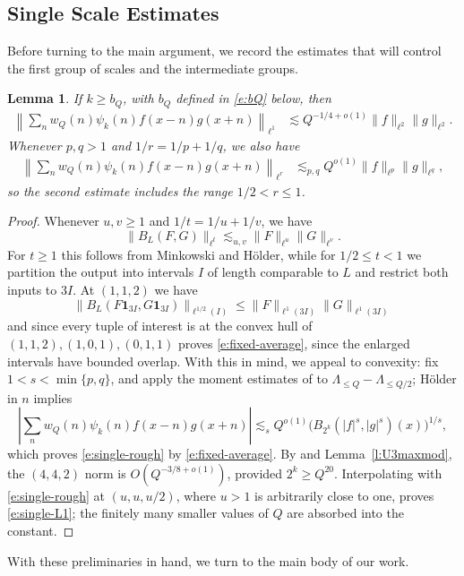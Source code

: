 \documentclass[12pt,leqno]{amsart}
\numberwithin{equation}{section}
\newtheorem{lemma}[equation]{Lemma}
\theoremstyle{definition}
\theoremstyle{plain}
\begin{document}
	\subsection{Single Scale Estimates}
	Before turning to the main argument, we record the estimates that will
	control the first group of scales and the intermediate groups.
	\begin{lemma}\label{l:singlescalecomplexitybetter}
		If $k\geq b_Q$, with $b_Q$ defined in \eqref{e:bQ} below, then
		\begin{align}\label{e:single-L1}
			\left\|\sum_n w_Q(n)\psi_k(n)f(x-n)g(x+n)\right\|_{\ell^1}
			&\lesssim Q^{-1/4+o(1)}\|f\|_{\ell^2}\|g\|_{\ell^2}.
		\end{align}
		Whenever $p,q>1$ and $1/r=1/p+1/q$, we also have
		\begin{align}\label{e:single-rough}
			\left\|\sum_n w_Q(n)\psi_k(n)f(x-n)g(x+n)\right\|_{\ell^r}
			&\lesssim_{p,q}Q^{o(1)}\|f\|_{\ell^p}\|g\|_{\ell^q},
		\end{align}
		so the second estimate includes the range $1/2<r\leq 1$.
	\end{lemma}
	\begin{proof}
		Whenever $u,v\geq1$ and $1/t=1/u+1/v$, we have
		\begin{equation}\label{e:fixed-average}
			\|B_L(F,G)\|_{\ell^t}\lesssim_{u,v}
			\|F\|_{\ell^u}\|G\|_{\ell^v}.
		\end{equation}
		For $t\geq1$ this follows from Minkowski and H\"older, while for
		$1/2\leq t<1$ we partition the output into intervals $I$ of length
		comparable to $L$ and restrict both inputs to $3I$.
		At $(1,1,2)$ we have
		\[
		\|B_L(F\mathbf1_{3I},G\mathbf1_{3I})\|_{\ell^{1/2}(I)}
		\leq  \| F \|_{\ell^{1}(3I)} \| G \|_{\ell^1(3I)}
		\]
		and since every tuple of interest is at the convex hull of $(1,1,2), (1,0,1), (0,1,1)$ proves \eqref{e:fixed-average},
		since the enlarged intervals have bounded overlap. With this in mind, we appeal to convexity: fix $1<s<\min\{p,q\}$, and apply the moment estimates of \cite[Lemma 4.6]{KMTT25} to $\Lambda_{\leq Q}-\Lambda_{\leq Q/2}$; H\"older in $n$ implies
		\[
		\left|\sum_n w_Q(n)\psi_k(n)f(x-n)g(x+n)\right|
		\lesssim_s Q^{o(1)}
		\big(B_{2^k}(|f|^s,|g|^s)(x)\big)^{1/s},
		\]
		which proves \eqref{e:single-rough} by \eqref{e:fixed-average}.
		By \cite[Proposition 2.1]{F+} and Lemma~\ref{l:U3maxmod}, the
		$(4,4,2)$ norm is $O(Q^{-3/8+o(1)})$, provided $2^k \geq Q^{20}$.
		Interpolating with \eqref{e:single-rough} at $(u,u,u/2)$, where
		$u>1$ is arbitrarily close to one, proves \eqref{e:single-L1};
		the finitely many smaller values of $Q$ are absorbed into the constant.
	\end{proof}
	With these preliminaries in hand, we turn to the main body of our work.
\end{document}
